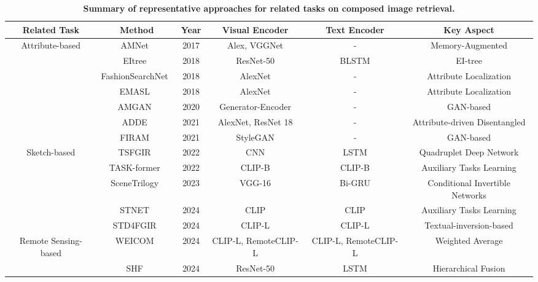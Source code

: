 \label{sec: meth_o}

\begin{table*}
  \scriptsize
  \centering
  \caption{\textbf{Summary of representative approaches for related tasks on composed image retrieval.}}
  \label{tab: task_based_ir}
    \begin{tabular}{|c|c|c|c|c|c|}
    \hline
      Related Task & Method & Year & Visual Encoder & Text Encoder & Key Aspect\\
    \hline 
    
    \multirow{7}{*}{Attribute-based} 
    & AMNet~\cite{amnet} & 2017 & Alex, VGGNet & - & Memory-Augmented \\ 
    \cline{2-6}
    & EItree~\cite{eitree} & 2018 & ResNet-50 & BLSTM & EI-tree \\ 
    \cline{2-6}
    & FashionSearchNet~\cite{FashionSearchNet} & 2018 & AlexNet & - & Attribute Localization \\
    \cline{2-6}
    & EMASL~\cite{EMASL} & 2018 & AlexNet & - & Attribute Localization \\
    \cline{2-6}
    & AMGAN~\cite{amgan} & 2020 & Generator-Encoder & - & GAN-based \\
    \cline{2-6}
    & ADDE~\cite{adde} & 2021 & AlexNet, ResNet 18 & - & Attribute-driven Disentangled \\
    \cline{2-6}
    & FIRAM~\cite{firam} & 2021 & StyleGAN & - & GAN-based \\  

    \hline
    
    \multirow{4}{*}{Sketch-based}
   & TSFGIR~\cite{tsfgir} & 2022 & CNN  & LSTM & Quadruplet Deep Network\\
    \cline{2-6}
    & TASK-former~\cite{taskformer} & 2022 & CLIP-B & CLIP-B & Auxiliary Tasks Learning\\
    \cline{2-6}
    & SceneTrilogy~\cite{SceneTrilogy} & 2023 & VGG-16  & Bi-GRU & Conditional Invertible Networks \\
    \cline{2-6}
    & STNET~\cite{stnet} & 2024 & CLIP & CLIP & Auxiliary Tasks Learning\\
    \cline{2-6}
    & STD4FGIR~\cite{STD4FGIR} & 2024 & CLIP-L & CLIP-L & Textual-inversion-based \\
    
    \hline

    \multirow{2}{*}{Remote Sensing-based} 
    & WEICOM~\cite{weicom} & 2024 & CLIP-L, RemoteCLIP-L & CLIP-L, RemoteCLIP-L & Weighted Average\\
    \cline{2-6}
    & SHF~\cite{shf} & 2024 & ResNet-50 & LSTM & Hierarchical Fusion\\   


\end{tabular}
\end{table*}

